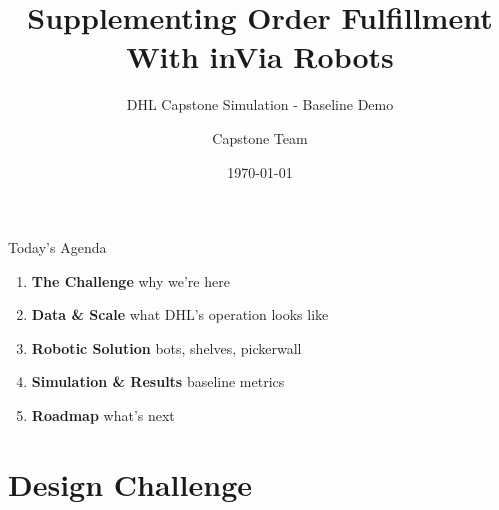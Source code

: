 \documentclass[aspectratio=169, 12pt]{beamer}
\title{Supplementing Order Fulfillment With inVia Robots}
\subtitle{DHL Capstone Simulation - Baseline Demo}
\author{Capstone Team}  %
\institute{University Capstone Project \\ in partnership with DHL}
\date{\today}
\begin{document}

{
\begin{frame}[plain]
  \vspace{1em}
  \titlepage
\end{frame}
}

\begin{frame}{Today's Agenda}
  \setlength{\leftmargini}{1.5em}
  \begin{enumerate}
    \item \textbf{The Challenge} \hfill \small\color{dhlGrey} why we're here
    \item \textbf{Data \& Scale} \hfill \small\color{dhlGrey} what DHL's operation looks like
    \item \textbf{Robotic Solution} \hfill \small\color{dhlGrey} bots, shelves, pickerwall
    \item \textbf{Simulation \& Results} \hfill \small\color{dhlGrey} baseline metrics
    \item \textbf{Roadmap} \hfill \small\color{dhlGrey} what's next
  \end{enumerate}
\end{frame}

\section{Design Challenge}
\end{document}
